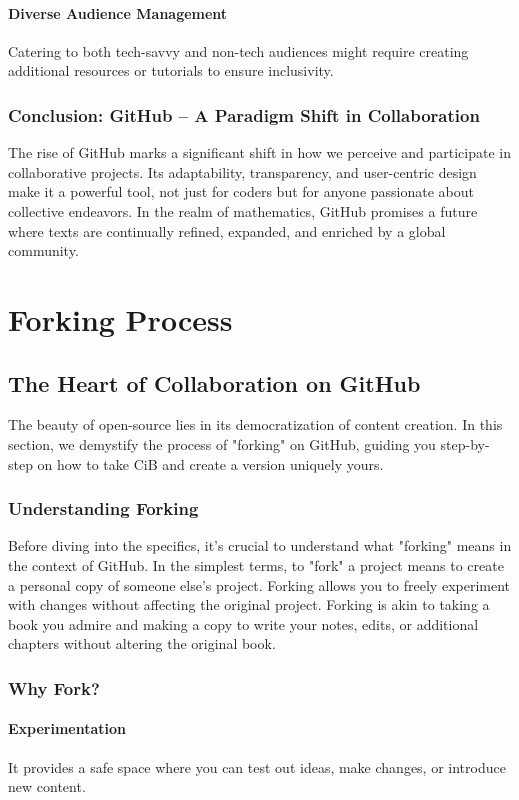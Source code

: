 \documentclass[a4paper,12pt]{book}
\begin{document}
\subsubsection*{Diverse Audience Management}
Catering to both tech-savvy and non-tech audiences might require creating additional resources or tutorials to ensure inclusivity.

\subsection*{Conclusion: GitHub – A Paradigm Shift in Collaboration}
The rise of GitHub marks a significant shift in how we perceive and participate in collaborative projects. Its adaptability, transparency, and user-centric design make it a powerful tool, not just for coders but for anyone passionate about collective endeavors. In the realm of mathematics, GitHub promises a future where texts are continually refined, expanded, and enriched by a global community.

\chapter{Forking Process}
\section*{The Heart of Collaboration on GitHub}
The beauty of open-source lies in its democratization of content creation. In this section, we demystify the process of "forking" on GitHub, guiding you step-by-step on how to take CiB and create a version uniquely yours.

\subsection*{Understanding Forking}
Before diving into the specifics, it's crucial to understand what "forking" means in the context of GitHub. In the simplest terms, to "fork" a project means to create a personal copy of someone else's project. Forking allows you to freely experiment with changes without affecting the original project. Forking is akin to taking a book you admire and making a copy to write your notes, edits, or additional chapters without altering the original book.

\subsection*{Why Fork?}
\subsubsection*{Experimentation}
It provides a safe space where you can test out ideas, make changes, or introduce new content.
\end{document}
